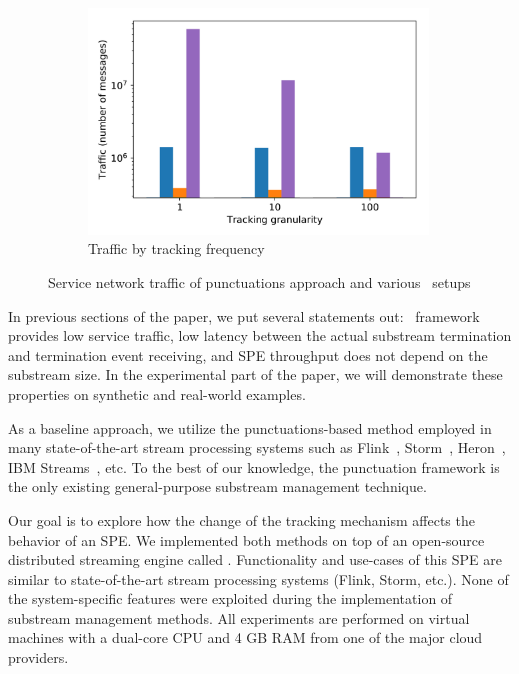 \begin{figure}[t!]
\begin{subfigure}[b]{0.25\textwidth}
            \includegraphics[width=0.99\textwidth]{pics/traffic_by_tracking_frequency_bars.png}
            \caption{Traffic by tracking frequency}
            \label{traffic_granularity}
    \end{subfigure}
    \caption{Service network traffic of punctuations approach and various \tracker\ setups}
    \label{traffic_plots}
\end{figure}
In previous sections of the paper, we put several statements out: \tracker\ framework provides low service traffic, low latency between the actual substream termination and termination event receiving, and SPE throughput does not depend on the substream size. In the experimental part of the paper, we will demonstrate these properties on synthetic and real-world examples. 

As a baseline approach, we utilize the punctuations-based method employed in many state-of-the-art stream processing systems such as Flink~\cite{Carbone:2017:SMA:3137765.3137777}, Storm~\cite{apache:storm:state}, Heron~\cite{Kulkarni:2015:THS:2723372.2742788}, IBM Streams~\cite{jacques2016consistent}, etc. To the best of our knowledge, the punctuation framework is the only existing general-purpose substream management technique.

Our goal is to explore how the change of the tracking mechanism affects the behavior of an SPE. We implemented both methods on top of an open-source distributed streaming engine called \FlameStream. Functionality and use-cases of this SPE are similar to state-of-the-art stream processing systems (Flink, Storm, etc.). None of the system-specific features were exploited during the implementation of substream management methods. All experiments are performed on virtual machines with a dual-core CPU and 4 GB RAM from one of the major cloud providers. 

